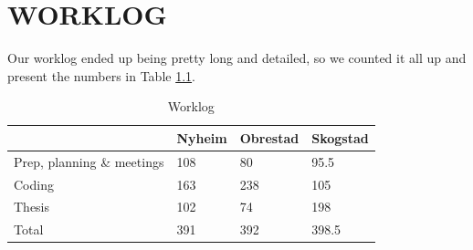 \chapter{WORKLOG}
Our worklog ended up being pretty long and detailed, so we counted it all up and
present the numbers in Table \ref{tab:worklog}.

\renewcommand{\arraystretch}{1.5}
\begin{table}[h]
  \centering
\begin{tabular}{l|l|l|l}
 & Nyheim & Obrestad & Skogstad \\
 \hline
 Prep, planning \& meetings & 108 & 80 & 95.5 \\
 Coding & 163 & 238 & 105 \\
 Thesis & 102 & 74 & 198 \\
 \hline
 Total & 391 & 392 & 398.5 \\
\end{tabular}
\caption{Worklog}
  \label{tab:worklog}
\end{table}
